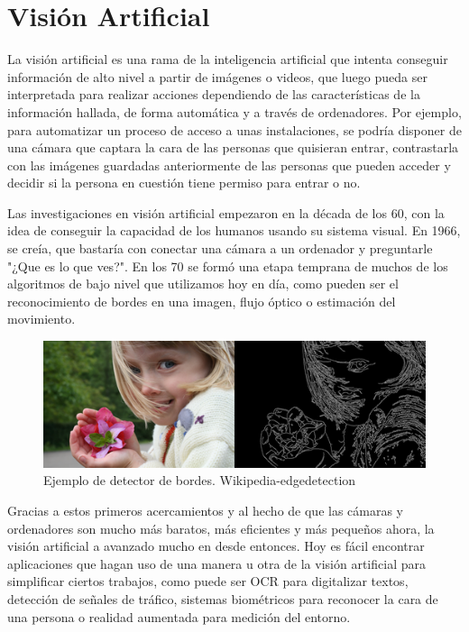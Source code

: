 \documentclass[a4paper, 12pt]{book}
\begin{document}
\section{Visión Artificial}
\label{sec:visionartificial}

La visión artificial es una rama de la inteligencia artificial que intenta conseguir información de alto nivel a partir de imágenes o videos, que luego pueda ser interpretada para realizar acciones dependiendo de las características de la información hallada, de forma automática y a través de ordenadores. Por ejemplo, para automatizar un proceso de acceso a unas instalaciones, se podría disponer de una cámara que captara la cara de las personas que quisieran entrar, contrastarla con las imágenes guardadas anteriormente de las personas que pueden acceder y decidir si la persona en cuestión tiene permiso para entrar o no.

Las investigaciones en visión artificial empezaron en la década de los 60, con la idea de conseguir la capacidad de los humanos usando su sistema visual. En 1966, se creía, que bastaría con conectar una cámara a un ordenador y preguntarle "¿Que es lo que ves?". En los 70 se formó una etapa temprana de muchos de los algoritmos de bajo nivel que utilizamos hoy en día, como pueden ser el reconocimiento de bordes en una imagen, flujo óptico o estimación del movimiento.

\begin{figure}[ht]
\centering
\includegraphics[scale=0.8]{img/edge_detection.png}%
\caption{Ejemplo de detector de bordes. Wikipedia-edgedetection}%
\end{figure}

Gracias a estos primeros acercamientos y al hecho de que las cámaras y ordenadores son mucho más baratos, más eficientes y más pequeños ahora, la visión artificial a avanzado mucho en desde entonces. Hoy es fácil encontrar aplicaciones que hagan uso de una manera u otra de la visión artificial para simplificar ciertos trabajos, como puede ser OCR para digitalizar textos, detección de señales de tráfico, sistemas biométricos para reconocer la cara de una persona o realidad aumentada para medición del entorno.
\end{document}

